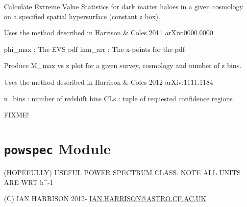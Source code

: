 \documentclass[letterpaper,10pt,english]{sphinxmanual}
\begin{document}

\begin{fulllineitems}
\label{PyCosmo:PyCosmo.hmf_extremes.evs_hypersurface_pdf}
Calculate Extreme Value Statistics for dark matter haloes in a given
cosmology on a specified spatial hypersurface (constant z box).

Uses the method described in Harrison \& Coles 2011 arXiv:0000.0000

phi\_max : The EVS pdf
lnm\_arr : The x-points for the pdf

\end{fulllineitems}


\begin{fulllineitems}
\label{PyCosmo:PyCosmo.hmf_extremes.evs_survey}
Produce M\_max vs z plot for a given survey, cosmology and
number of z bins.

Uses the method described in Harrison \& Coles 2012 arXiv:1111.1184

n\_bins : number of redshift bins
CLs : tuple of requested confidence regions

FIXME!

\end{fulllineitems}



\section{\texttt{powspec} Module}
\label{PyCosmo:module-PyCosmo.powspec}\label{PyCosmo:powspec-module}
(HOPEFULLY) USEFUL POWER SPECTRUM CLASS.
NOTE ALL UNITS ARE WRT h\textasciicircum{}-1

(C) IAN HARRISON
2012-
\href{mailto:IAN.HARRISON@ASTRO.CF.AC.UK}{IAN.HARRISON@ASTRO.CF.AC.UK}
\end{document}
